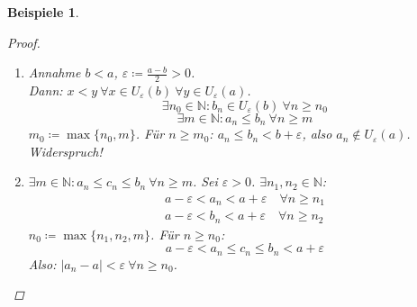 \documentclass{extreport}
\newcommand{\N}{\mathbb{N}}
\theoremstyle{named}
\theoremstyle{dotless}
\newtheorem*{beispiele}{Beispiele}
\begin{document}
\begin{beispiele}
\begin{proof}
\begin{enumerate}
\begin{enumerate}
					$$
						c_{n} \leq c(|b_{n}-b| + |a_{n}-a|) \eqqcolon \alpha_{n} \xRightarrow[c) (ii), c) (iii)]{a)} \alpha_{n} \rightarrow 0
					$$
					Also: $|c_{n} - 0| = c_{n} \leq \alpha_{n} ~\forall n \in \N$ und $\alpha_{n} \rightarrow 0 \xRightarrow[]{b)} c_{n} \rightarrow 0$.
				\item $\varepsilon \coloneqq \frac{|a|}{2}$; aus (i): $|a_{n}| \rightarrow |a| \Rightarrow \exists n \in N$:
					$$
						 |a_{n}| \in U_{\varepsilon}(|a|) = (|a| - \varepsilon, |a| + \varepsilon) = (\frac{|a|}{2}, \frac{3}{2} |a|) \quad \forall n \geq m
					$$
					$\Rightarrow |a_{n}| > \frac{|a|}{2} > 0 ~\forall n \geq m \Rightarrow a_{n} \neq 0 ~\forall n \geq m$. Für $n \geq m$:
					$$
						\left| \frac{1}{a_{n}} - \frac{1}{a} \right| = \frac{|a_{n} - a|}{|a_{n}||a|} \leq \frac{2|a_{n} - a|}{|a|^{2}} \eqqcolon \alpha_{n}
					$$
					$\alpha_{n} \rightarrow 0 \xRightarrow[]{b)} \frac{1}{a_{n}} \rightarrow \frac{1}{a}$.
			  \end{enumerate}
			\item Annahme $b < a$, $\varepsilon \coloneqq \frac{a-b}{2} > 0$. ~  \\
				Dann: $x < y ~\forall x \in U_{\varepsilon}(b) ~\forall y \in U_{\varepsilon}(a)$. \\
				$$ \exists n_{0} \in \N: b_{n} \in U_{\varepsilon}(b) ~\forall n \geq n_{0} $$
				$$ \exists m \in \N: a_{n} \leq b_{n} ~\forall n \geq m $$
				$m_{0} \coloneqq \max \{ n_{0}, m \}$. Für $n \geq m_{0}$: $a_{n} \leq b_{n} < b + \varepsilon$, also $a_{n} \notin U_{\varepsilon}(a)$. Widerspruch!   
			\item $\exists m \in \N: a_{n} \leq c_{n} \leq b_{n} ~\forall n \geq m$. Sei $\varepsilon > 0$. $\exists n_{1}, n_{2} \in \N$: 
				\begin{align*}
					a - \varepsilon < a_{n} < a + \varepsilon \quad \forall n \geq n_{1} \\
					a - \varepsilon < b_{n} < a + \varepsilon \quad \forall n \geq n_{2}
				\end{align*}
				$n_{0} \coloneqq \max \{ n_{1}, n_{2}, m \}$. Für $n \geq n_{0}$:
				$$
					a - \varepsilon < a_{n} \leq c_{n} \leq b_{n} < a + \varepsilon
				$$
				Also: $|a_{n} - a| < \varepsilon ~\forall n \geq n_{0}$.
		\end{enumerate}	
	\end{proof}	
\end{beispiele}
\end{document}
